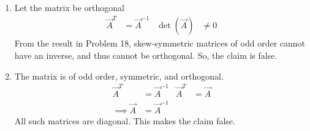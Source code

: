 \begin{enumerate}
    \item Let the matrix be orthogonal
          \begin{align}
              \vec{A}^T     & = \vec{A}^{-1} &
              \det(\vec{A}) & \neq 0
          \end{align}
          From the result in Problem 18, skew-symmetric matrices of odd order cannot
          have an inverse, and thus cannot be orthogonal. So, the claim is
          \textcolor{y_p}{false}.

    \item The matrix is of odd order, symmetric, and orthogonal.
          \begin{align}
              \vec{A}^T        & = \vec{A}^{-1} &
              \vec{A}^T        & = \vec{A}        \\
              \implies \vec{A} & = \vec{A}^{-1}
          \end{align}
          All such matrices are diagonal. This makes the claim \textcolor{y_p}{false}.
\end{enumerate}